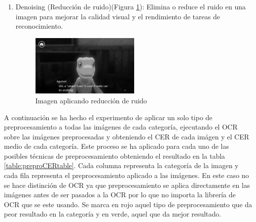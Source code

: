 \begin{enumerate}
	\item Denoising (Reducción de ruido)(Figura \ref{fig:Denoising}): 
	Elimina o reduce el ruido en una imagen para mejorar la calidad visual y el rendimiento de tareas de reconocimiento.
		\begin{figure}[H]
		\centering
		\includegraphics[width = 0.5\textwidth]{Imagenes/Preprocesado/11.png}
			\caption{Imagen aplicando reducción de ruido}
		\label{fig:Denoising}
	\end{figure}
	
\end{enumerate}
A continuación se ha hecho el experimento de aplicar un solo tipo de preprocesamiento a todas las imágenes de cada categoría, ejecutando el OCR sobre las imágenes preprocesadas y obteniendo el CER de cada imágen y el CER medio de cada categoría. Este proceso se ha aplicado para cada uno de las posibles técnicas de preprocesamiento obteniendo el resultado en la tabla \ref{table:preproCERtable}. Cada columna representa la categoría de la imagen y cada fila representa el preprocesamiento aplicado a las imágenes. En este caso no se hace distinción de OCR ya que preprocesamiento se aplica directamente en las imágenes antes de ser pasados a la OCR por lo que no importa la librería de OCR que se este usando.
Se marca en rojo aquel tipo de preprocesamiento que da peor resultado en la categoría y en verde, aquel que da mejor resultado.
